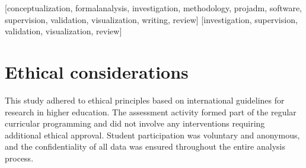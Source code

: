 \documentclass[english]{textolivre}
\begin{document}
\printbibliography\label{sec-bib}


\begin{contributors}
[conceptualization, formalanalysis, investigation, methodology, projadm, software, supervision, validation, visualization, writing, review]
[investigation, supervision, validation, visualization, review]
\end{contributors}

\section*{Ethical considerations}
This study adhered to ethical principles based on international guidelines for research in higher education. The assessment activity formed part of the regular curricular programming and did not involve any interventions requiring additional ethical approval. Student participation was voluntary and anonymous, and the confidentiality of all data was ensured throughout the entire analysis process.

\begin{dataavailability}
\end{dataavailability}
\end{document}
